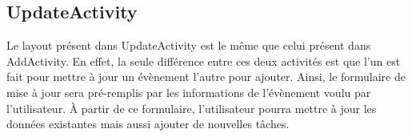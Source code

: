 \documentclass[12pt,a4paper]{report}
\begin{document}
\subsection{UpdateActivity}
\begin{flushleft}
\justify
Le layout présent dans UpdateActivity est le même que celui présent dans AddActivity. En effet, la seule différence entre ces deux activités est que l'un est fait pour mettre à jour un évènement l'autre pour ajouter. Ainsi, le formulaire de mise à jour sera pré-remplis par les informations de l'évènement voulu par l'utilisateur. \`A partir de ce formulaire, l'utilisateur pourra mettre à jour les données existantes mais aussi ajouter de nouvelles tâches. 
\begin{figure}[!h]
    \centering
    \begin{subfigure}[b]{0.3\textwidth}

\end{subfigure}
\end{figure}
\end{flushleft}
\end{document}
